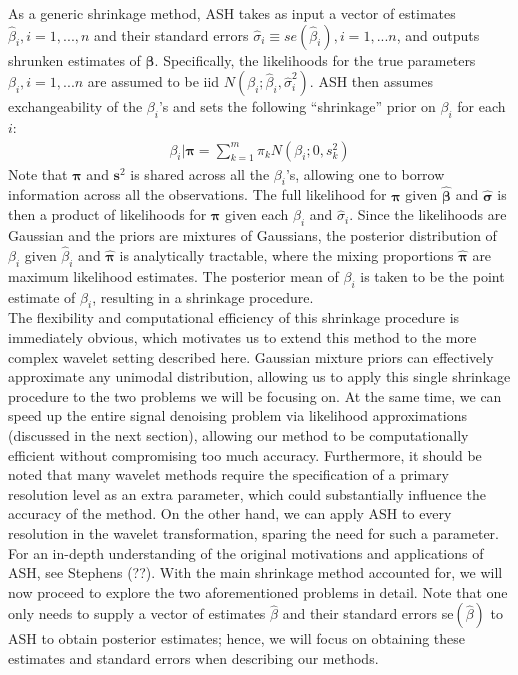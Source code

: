 \documentclass[12pt]{article}
\newcommand{\Gb}{\beta}
\newcommand{\s}{\sigma}
\begin{document}
As a generic shrinkage method, ASH takes as input a vector of estimates $\hat{\Gb}_i,i=1,...,n$ and their standard errors $\hat{\s}_i\equiv se(\hat{\Gb}_i),i=1,...n$, and outputs shrunken estimates of $\bm{\Gb}$. Specifically, the likelihoods for the true parameters $\Gb_i,i=1,...n$ are assumed to be iid $N(\Gb_i;\hat{\Gb}_i,\hat{\s}_i^2)$. ASH then assumes exchangeability of the $\Gb_i$'s and sets the following ``shrinkage'' prior on $\Gb_i$ for each $i$:
\begin{eqnarray}
\Gb_i|\bm{\pi}=\sum_{k=1}^m \pi_k N(\Gb_i;0,s_k^2)
\end{eqnarray}
Note that $\bm{\pi}$ and $\bm{s}^2$ is shared across all the $\Gb_i$'s, allowing one to borrow information across all the observations. The full likelihood for $\bm{\pi}$ given $\bm{\hat{\Gb}}$ and $\bm{\hat{\s}}$ is then a product of likelihoods for $\bm{\pi}$ given each $\hat{\Gb}_i$ and $\hat{\s}_i$. Since the likelihoods are Gaussian and the priors are mixtures of Gaussians, the posterior distribution of $\Gb_i$ given $\hat{\Gb}_i$ and $\bm{\hat{\pi}}$ is analytically tractable, where the mixing proportions $\bm{\hat{\pi}}$ are maximum likelihood estimates. The posterior mean of $\Gb_i$ is taken to be the point estimate of $\Gb_i$, resulting in a shrinkage procedure.\bigskip\\
The flexibility and computational efficiency of this shrinkage procedure is immediately obvious, which motivates us to extend this method to the more complex wavelet setting described here. Gaussian mixture priors can effectively approximate any unimodal distribution, allowing us to apply this single shrinkage procedure to the two problems we will be focusing on. At the same time, we can speed up the entire signal denoising problem via likelihood approximations (discussed in the next section), allowing our method to be computationally efficient without compromising too much accuracy. Furthermore, it should be noted that many wavelet methods require the specification of a primary resolution level as an extra parameter, which could substantially influence the accuracy of the method. On the other hand, we can apply ASH to every resolution in the wavelet transformation, sparing the need for such a parameter. For an in-depth understanding of the original motivations and applications of ASH, see Stephens (??). With the main shrinkage method accounted for, we will now proceed to explore the two aforementioned problems in detail. Note that one only needs to supply a vector of estimates $\hat{\Gb}$ and their standard errors se$(\hat{\Gb})$ to ASH to obtain posterior estimates; hence, we will focus on obtaining these estimates and standard errors when describing our methods.
\end{document}
